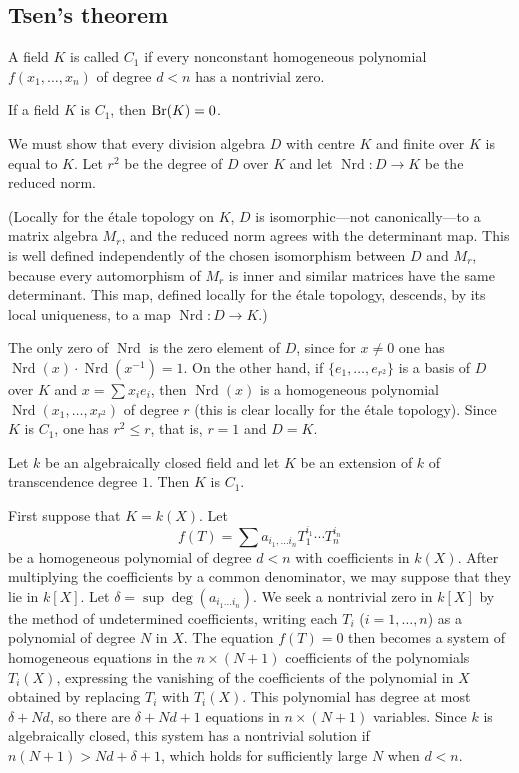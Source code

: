 \subsection{Tsen's theorem}\label{I:3-2}

\begin{definition}\label{I:3-2-1}
A field $K$ is called $C_1$ if every nonconstant homogeneous polynomial
$f(x_1,\dotsc,x_n)$ of degree $d<n$ has a nontrivial zero.
\end{definition}

\begin{proposition}\label{I:3-2-2}
If a field $K$ is $C_1$, then $\operatorname{Br}(K)=0$.
\end{proposition}

We must show that every division algebra $D$ with centre $K$ and finite
over $K$ is equal to $K$. Let $r^2$ be the degree of $D$ over $K$ and
let $\operatorname{Nrd}:D\to K$ be the reduced norm.

(Locally for the étale topology on $K$, $D$ is isomorphic---not
canonically---to a matrix algebra $M_r$, and the reduced norm agrees with
the determinant map. This is well defined independently of the chosen
isomorphism between $D$ and $M_r$, because every automorphism of $M_r$
is inner and similar matrices have the same determinant. This map, defined
locally for the étale topology, descends, by its local uniqueness, to a map
$\operatorname{Nrd}:D\to K$.)

The only zero of $\operatorname{Nrd}$ is the zero element of $D$, since
for $x\ne0$ one has
$\operatorname{Nrd}(x)\cdot\operatorname{Nrd}(x^{-1})=1$. On the other
hand, if $\{e_1,\dotsc,e_{r^2}\}$ is a basis of $D$ over $K$ and
$x=\sum x_ie_i$, then $\operatorname{Nrd}(x)$ is a homogeneous
polynomial $\operatorname{Nrd}(x_1,\dotsc,x_{r^2})$ of degree $r$
(this is clear locally for the étale topology). Since $K$ is $C_1$, one
has $r^2\leqslant r$, that is, $r=1$ and $D=K$.

\begin{theorem}[Tsen]\label{I:3-2-3}
Let $k$ be an algebraically closed field and let $K$ be an extension of
$k$ of transcendence degree $1$. Then $K$ is $C_1$.
\end{theorem}

First suppose that $K=k(X)$. Let
\[
  f(T) = \sum a_{i_1,\dotsc i_n} T_1^{i_1} \dotsm T_n^{i_n}
\]
be a homogeneous polynomial of degree $d<n$ with coefficients in
$k(X)$. After multiplying the coefficients by a common denominator, we
may suppose that they lie in $k[X]$. Let
$\delta=\sup\deg(a_{i_1\dotsc i_n})$. We seek a nontrivial zero in
$k[X]$ by the method of undetermined coefficients, writing each $T_i$
($i=1,\dotsc,n$) as a polynomial of degree $N$ in $X$. The equation
$f(T)=0$ then becomes a system of homogeneous equations in the
$n\times(N+1)$ coefficients of the polynomials $T_i(X)$, expressing the
vanishing of the coefficients of the polynomial in $X$ obtained by
replacing $T_i$ with $T_i(X)$. This polynomial has degree at most
$\delta+Nd$, so there are $\delta+Nd+1$ equations in
$n\times(N+1)$ variables. Since $k$ is algebraically closed, this system
has a nontrivial solution if $n(N+1)>Nd+\delta+1$, which holds for
sufficiently large $N$ when $d<n$.

